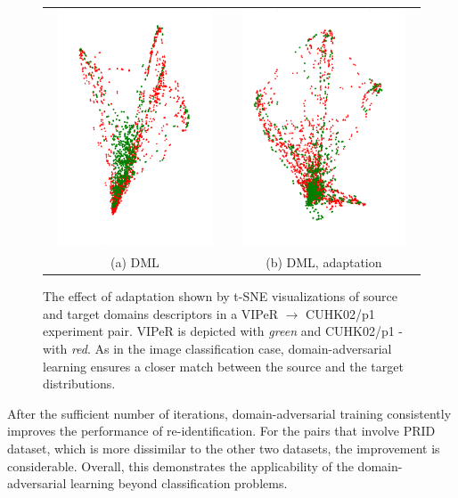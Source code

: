 \begin{figure}
\centering
\begin{tabular}{c c}
\includegraphics[height=7cm, width=7cm]{Chapters/gradrev/figures/reid_adapt_results/viper_cuhkp1_zc.png}&
\includegraphics[height=7cm, width=7cm]{Chapters/gradrev/figures/reid_adapt_results/viper_cuhkp1_da.png}\\
\small{(a) DML}&
\small{(b) DML, adaptation}\\
\end{tabular}
\caption{The effect of adaptation shown by t-SNE visualizations of source and target domains descriptors in a VIPeR $\rightarrow$ CUHK02/p1 experiment pair. VIPeR is depicted with \textit{green} and CUHK02/p1 - with \textit{red}. As in the image classification case, domain-adversarial learning ensures a closer match between the source and the target distributions. }
\label{fig:reidtsne}
\end{figure}


After the sufficient number of iterations, domain-adversarial training consistently improves the performance of re-identification. For the pairs that involve PRID dataset, which is more dissimilar to the other two datasets, the improvement is considerable. Overall, this demonstrates the applicability of the domain-adversarial learning beyond classification problems.

